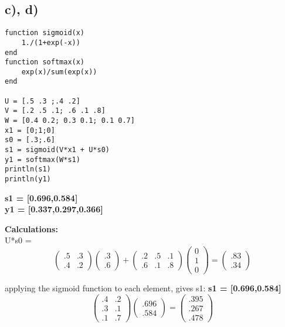 \documentclass{article}
\begin{document}
\subsection*{c), d)}
\begin{lstlisting}
function sigmoid(x)
    1./(1+exp(-x))
end
function softmax(x)
    exp(x)/sum(exp(x))
end

U = [.5 .3 ;.4 .2]
V = [.2 .5 .1; .6 .1 .8]
W = [0.4 0.2; 0.3 0.1; 0.1 0.7]
x1 = [0;1;0]
s0 = [.3;.6]
s1 = sigmoid(V*x1 + U*s0)
y1 = softmax(W*s1)
println(s1)
println(y1)
\end{lstlisting}

\newpage

\textbf{s1 = [0.696,0.584]}\\
\textbf{y1 = [0.337,0.297,0.366]}

\textbf{Calculations:\\}
U*s0 = \[ \left( \begin{array}{cc}
.5 & .3 \\
.4 & .2 \end{array} \right)\left( \begin{array}{c}
.3  \\
.6  \end{array} \right) + \left( \begin{array}{ccc}
.2 & .5 & .1\\
.6 & .1 & .8 \end{array} \right)\left( \begin{array}{c}
0  \\
1  \\ 
0 \end{array} \right) = \left( \begin{array}{c}
.83  \\
.34  \end{array} \right) \]

applying the sigmoid function to each element, gives s1:
\textbf{s1 = [0.696,0.584]}\\


\[ \left( \begin{array}{cc}
.4 & .2 \\
.3 & .1 \\
.1 & .7 \end{array} \right)\left( \begin{array}{c}
.696  \\
.584  \end{array} \right) = \left( \begin{array}{c}
.395  \\
.267  \\
.478 \end{array} \right)\]
\end{document}
